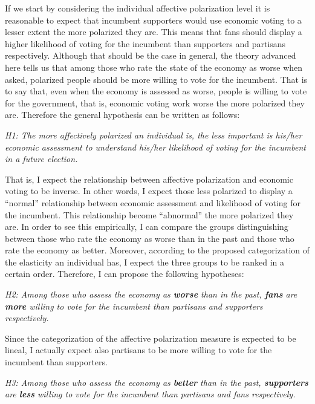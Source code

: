 \documentclass[a4paper, svgnames]{article}
\begin{document}
If we start by considering the individual affective polarization level it is reasonable to expect that incumbent supporters would use economic voting to a lesser extent the more polarized they are. This means that fans should display a higher likelihood of voting for the incumbent than supporters and partisans respectively. Although that should be the case in general, the theory advanced here tells us that among those who rate the state of the economy as worse when asked, polarized people should be more willing to vote for the incumbent. That is to say that, even when the economy is assessed as worse, people is willing to vote for the government, that is, economic voting work worse the more polarized they are. Therefore the general hypothesis can be written as follows:

\textit{H1: The more affectively polarized an individual is, the less important is his/her economic assessment to understand his/her likelihood of voting for the incumbent in a future election.}

That is, I expect the relationship between affective polarization and economic voting to be inverse. In other words, I expect those less polarized to display a ``normal'' relationship between economic assessment and likelihood of voting for the incumbent. This relationship become ``abnormal'' the more polarized they are. In order to see this empirically, I can compare the groups distinguishing between those who rate the economy as worse than in the past and those who rate the economy as better. Moreover, according to the proposed categorization of the elasticity an individual has, I expect the three groups to be ranked in a certain order. Therefore, I can propose the following hypotheses:

\textit{H2: Among those who assess the economy as \textbf{worse} than in the past, \textbf{fans} are \textbf{more} willing to vote for the incumbent than partisans and supporters respectively.}

Since the categorization of the affective polarization measure is expected to be lineal, I actually expect also partisans to be more willing to vote for the incumbent than supporters.

\textit{H3: Among those who assess the economy as \textbf{better} than in the past, \textbf{supporters} are \textbf{less} willing to vote for the incumbent than partisans and fans respectively.}

\end{document}
